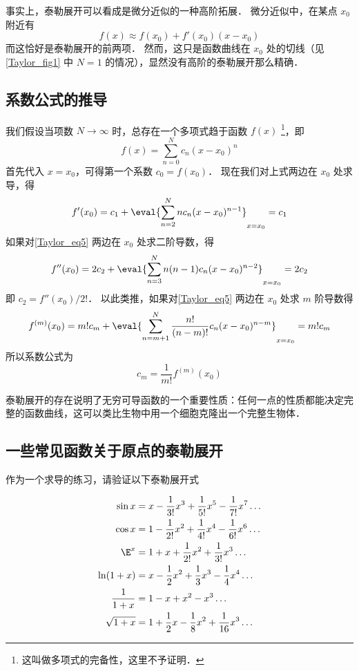 事实上，泰勒展开可以看成是微分近似的一种高阶拓展． 微分近似中，在某点 $x_0$ 附近有
\begin{equation}
f(x) \approx f({x_0}) + f'({x_0})(x - {x_0})
\end{equation}
而这恰好是泰勒展开的前两项． 然而，这只是函数曲线在 $x_0$ 处的切线（见\autoref{Taylor_fig1} 中 $N=1$ 的情况），显然没有高阶的泰勒展开那么精确． 

\subsection{系数公式的推导}
我们假设当项数 $N \to \infty$ 时，总存在一个多项式趋于函数 $f(x)$ \footnote{这叫做多项式的完备性，这里不予证明．}，即
\begin{equation}\label{Taylor_eq5}
f(x) = \sum_{n = 0}^N  c_n (x - x_0)^n
\end{equation}
首先代入 $x = x_0$，可得第一个系数 $c_0 = f(x_0)$． 现在我们对上式两边在 $x_0$ 处求导，得
\begin{equation}
f'(x_0) = c_1 + \eval{ \sum_{n = 2}^N n c_n (x - x_0)^{n - 1} }_{x = x_0}  = c_1
\end{equation}
如果对\autoref{Taylor_eq5} 两边在 $x_0$ 处求二阶导数，得
\begin{equation}
f''(x_0) = 2 c_2 + \eval{ \sum_{n = 3}^N  n(n - 1) c_n (x - x_0)^{n - 2} }_{x = x_0}  = 2 c_2
\end{equation}
即 ${c_2} = f''({x_0})/2!$．  以此类推，如果对\autoref{Taylor_eq5} 两边在 $x_0$ 处求 $m$ 阶导数得
\begin{equation}
f^{(m)}(x_0) = m! c_m + \eval{ \sum_{n = m + 1}^N  \frac{n!}{(n - m)!} c_n (x - x_0)^{n - m} }_{x = x_0}  = m! c_m
\end{equation}
所以系数公式为
\begin{equation}
{c_m} = \frac{1}{m!}{f^{(m)}}(x_0)
\end{equation}

泰勒展开的存在说明了无穷可导函数的一个重要性质：任何一点的性质都能决定完整的函数曲线，这可以类比生物中用一个细胞克隆出一个完整生物体．

\subsection{一些常见函数关于原点的泰勒展开}
作为一个求导的练习，请验证以下泰勒展开式

\begin{align}
\sin x &= x - \frac{1}{3!} x^3 + \frac{1}{5!} x^5 - \frac{1}{7!} x^7 \ldots\\
\cos x &= 1 - \frac{1}{2!} x^2 + \frac{1}{4!} x^4 -\frac{1}{6!} x^6 \ldots\\
\E^x &=1 + x + \frac{1}{2!} x^2 + \frac{1}{3!} x^3  \ldots\\
\ln (1+x) &= x - \frac 12 x^2 + \frac 13 x^3 - \frac 14 x^4 \ldots\\
\frac{1}{1+x} &= 1 - x + x^2 - x^3 \ldots\\
\sqrt{1+x} &= 1 + \frac 12 x - \frac 18 x^2 + \frac{1}{16} x^3 \ldots
\end{align}



